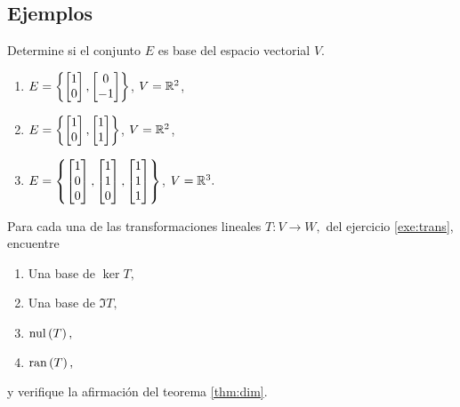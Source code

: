 \subsection*{Ejemplos}

\begin{problema}
 Determine si el conjunto $E$ es base del espacio vectorial $V.$
 \begin{enumerate}
  \item $E=\left\{ \begin{bmatrix}1\\0\end{bmatrix},\begin{bmatrix}0\\-1\end{bmatrix} \right\}$, $V=\mathbb{R}^{2}$,
  \item $E=\left\{ \begin{bmatrix}1\\0\end{bmatrix},\begin{bmatrix}1\\1\end{bmatrix} \right\}$, $V=\mathbb{R}^{2}$,
  \item $E=\left\{ \begin{bmatrix}1\\0\\0\end{bmatrix},\begin{bmatrix}1\\1\\0\end{bmatrix},\begin{bmatrix}1\\1\\1\end{bmatrix} \right\}$, $V=\mathbb{R}^{3}.$
 \end{enumerate}

\end{problema}


\begin{problema}
 Para cada una de las transformaciones lineales $T:V \to W,$ del ejercicio \ref{exe:trans}, encuentre
 \begin{enumerate}
  \item Una base de $\ker{T},$
  \item Una base de $\Im{T},$
  \item $\operatorname{nul}\left( T \right),$
  \item $\operatorname{ran}\left( T \right),$
\end{enumerate}
y verifique la afirmaci\'on del teorema \ref{thm:dim}.
\end{problema}







